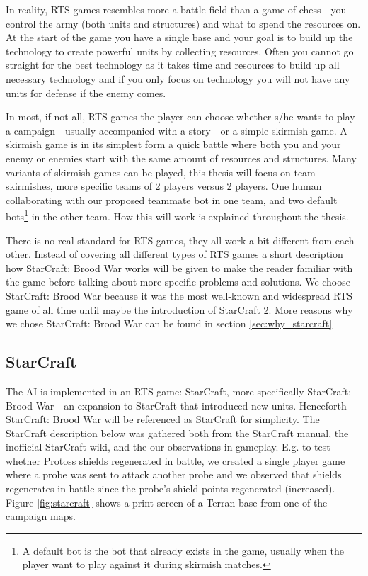 In reality, RTS games resembles more a battle field than a game of chess—you control the army (both units and structures) and what to spend the resources on. At the start of the game you have a single base and your goal is to build up the technology to create powerful units by collecting resources. Often you cannot go straight for the best technology as it takes time and resources to build up all necessary technology and if you only focus on technology you will not have any units for defense if the enemy comes.

In most, if not all, RTS games the player can choose whether s/he wants to play a campaign—usually accompanied with a story—or a simple skirmish game. A skirmish game is in its simplest form a quick battle where both you and your enemy or enemies start with the same amount of resources and structures. Many variants of skirmish games can be played, this thesis will focus on team skirmishes, more specific teams of 2 players versus 2 players. One human collaborating with our proposed teammate bot in one team, and two default bots\footnote{A default bot is the bot that already exists in the game, usually when the player want to play against it during skirmish matches.} in the other team. How this will work is explained throughout the thesis.

There is no real standard for RTS games, they all work a bit different from each other. Instead of covering all different types of RTS games a short description how StarCraft: Brood War works will be given to make the reader familiar with the game before talking about more specific problems and solutions. We choose StarCraft: Brood War because it was the most well-known and widespread RTS game of all time until maybe the introduction of StarCraft 2. More reasons why we chose StarCraft: Brood War can be found in section \ref{sec:why_starcraft}

\subsection{StarCraft}
The AI is implemented in an RTS game: StarCraft, more specifically StarCraft: Brood War—an expansion to StarCraft that introduced new units. Henceforth StarCraft: Brood War will be referenced as StarCraft for simplicity. The StarCraft description below was gathered both from the StarCraft manual\cite{scmanual}, the inofficial StarCraft wiki\cite{scwiki}, and the our observations in gameplay. E.g. to test whether Protoss shields regenerated in battle, we created a single player game where a probe was sent to attack another probe and we observed that shields regenerates in battle since the probe’s shield points regenerated (increased). Figure \ref{fig:starcraft} shows a print screen of a Terran base from one of the campaign maps.

